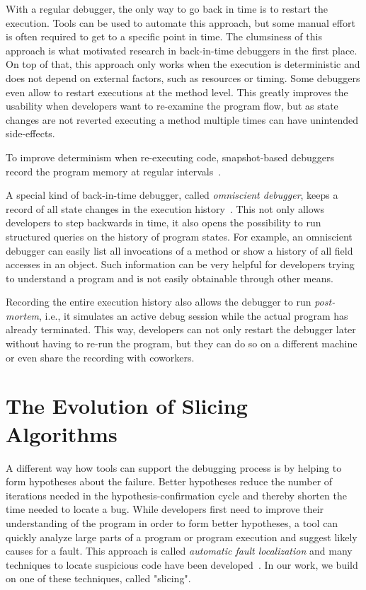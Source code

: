 With a regular debugger, the only way to go back in time is to restart the execution.
Tools can be used to automate this approach, but some manual effort is often required to get to a specific point in time.
The clumsiness of this approach is what motivated research in back-in-time debuggers in the first place.
On top of that, this approach only works when the execution is deterministic and does not depend on external factors, such as resources or timing.
Some debuggers even allow to restart executions at the method level.
This greatly improves the usability when developers want to re-examine the program flow, but as state changes are not reverted executing a method multiple times can have unintended side-effects.

To improve determinism when re-executing code, snapshot-based debuggers record the program memory at regular intervals~\cite{feldman88:igor_a_system, boothe00:efficient_algorithms_for_bidirectional}.

A special kind of back-in-time debugger, called \emph{omniscient debugger}, keeps a record of all state changes in the execution history~\cite{lewis03:debugging_backwards_in_time}.
This not only allows developers to step backwards in time, it also opens the possibility to run structured queries on the history of program states.
For example, an omniscient debugger can easily list all invocations of a method or show a history of all field accesses in an object.
Such information can be very helpful for developers trying to understand a program and is not easily obtainable through other means.

Recording the entire execution history also allows the debugger to run \emph{post-mortem}, i.e., it simulates an active debug session while the actual program has already terminated.
This way, developers can not only restart the debugger later without having to re-run the program, but they can do so on a different machine or even share the recording with coworkers.


\section{The Evolution of Slicing Algorithms}
\label{sec:evolution_of_slicing}

A different way how tools can support the debugging process is by helping to form hypotheses about the failure.
Better hypotheses reduce the number of iterations needed in the hypothesis-confirmation cycle and thereby shorten the time needed to locate a bug.
While developers first need to improve their understanding of the program in order to form better hypotheses, a tool can quickly analyze large parts of a program or program execution and suggest likely causes for a fault.
This approach is called \emph{automatic fault localization} and many techniques to locate suspicious code have been developed~\cite{wong16:a_survey_on_software}.
In our work, we build on one of these techniques, called "slicing".

